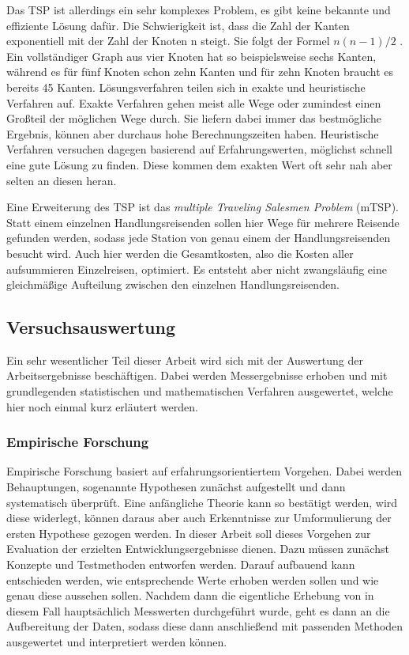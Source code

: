 Das TSP ist allerdings ein sehr komplexes Problem, es gibt keine bekannte und effiziente Lösung dafür. Die Schwierigkeit ist, dass die Zahl der Kanten exponentiell mit der Zahl der Knoten n steigt. Sie folgt der Formel $n(n-1)/2$ \cite{graphenEckenKanten}. Ein vollständiger Graph aus vier Knoten hat so beispielsweise sechs Kanten, während es für fünf Knoten schon zehn Kanten und für zehn Knoten braucht es bereits 45 Kanten. Lösungsverfahren teilen sich in exakte und heuristische Verfahren auf. Exakte Verfahren gehen meist alle Wege oder zumindest einen Großteil der möglichen Wege durch. Sie liefern dabei immer das bestmögliche Ergebnis, können aber durchaus hohe Berechnungszeiten haben. Heuristische Verfahren versuchen dagegen basierend auf Erfahrungswerten, möglichst schnell eine gute Lösung zu finden. Diese kommen dem exakten Wert oft sehr nah aber selten an diesen heran. \cite{travelingSalesman}

Eine Erweiterung des TSP ist das \textit{multiple Traveling Salesmen Problem} (mTSP). Statt einem einzelnen Handlungsreisenden sollen hier Wege für mehrere Reisende gefunden werden, sodass jede Station von genau einem der Handlungsreisenden besucht wird. Auch hier werden die Gesamtkosten, also die Kosten aller aufsummieren Einzelreisen, optimiert. Es entsteht aber nicht zwangsläufig eine gleichmäßige Aufteilung zwischen den einzelnen Handlungsreisenden. \cite{mtsp}

\subsection{Versuchsauswertung}

Ein sehr wesentlicher Teil dieser Arbeit wird sich mit der Auswertung der Arbeitsergebnisse beschäftigen. Dabei werden Messergebnisse erhoben und mit grundlegenden statistischen und mathematischen Verfahren ausgewertet, welche hier noch einmal kurz erläutert werden.

\subsubsection{Empirische Forschung}

Empirische Forschung basiert auf erfahrungsorientiertem Vorgehen. Dabei werden Behauptungen, sogenannte Hypothesen zunächst aufgestellt und dann systematisch überprüft. Eine anfängliche Theorie kann so bestätigt werden, wird diese widerlegt, können daraus aber auch Erkenntnisse zur Umformulierung der ersten Hypothese gezogen werden. In dieser Arbeit soll dieses Vorgehen zur Evaluation der erzielten Entwicklungsergebnisse dienen. Dazu müssen zunächst Konzepte und Testmethoden entworfen werden. Darauf aufbauend kann entschieden werden, wie entsprechende Werte erhoben werden sollen und wie genau diese aussehen sollen. Nachdem dann die eigentliche Erhebung von in diesem Fall hauptsächlich Messwerten durchgeführt wurde, geht es dann an die Aufbereitung der Daten, sodass diese dann anschließend mit passenden Methoden ausgewertet und interpretiert werden können. \cite{qualQuantForschung}

